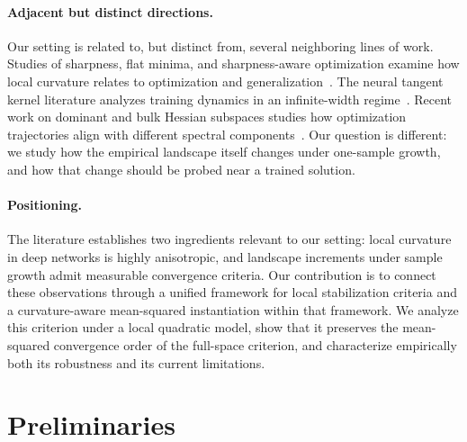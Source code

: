 \documentclass[10pt]{article}
\theoremstyle{plain}
\theoremstyle{remark}
\begin{document}
\paragraph{Adjacent but distinct directions.}
Our setting is related to, but distinct from, several neighboring lines of work.
Studies of sharpness, flat minima, and sharpness-aware optimization examine how local curvature relates to optimization and generalization~\citep{keskar2017largebatch,dinh2017sharp,foret2021sam,dauphin2024neglected,luo2024eigensam}.
The neural tangent kernel literature analyzes training dynamics in an infinite-width regime~\citep{jacot2018ntk}.
Recent work on dominant and bulk Hessian subspaces studies how optimization trajectories align with different spectral components~\citep{song2025tiny,zhou2025bsfa}.
Our question is different: we study how the empirical landscape itself changes under one-sample growth, and how that change should be probed near a trained solution.

\paragraph{Positioning.}
The literature establishes two ingredients relevant to our setting: local curvature in deep networks is highly anisotropic, and landscape increments under sample growth admit measurable convergence criteria.
Our contribution is to connect these observations through a unified framework for local stabilization criteria and a curvature-aware mean-squared instantiation within that framework.
We analyze this criterion under a local quadratic model, show that it preserves the mean-squared convergence order of the full-space criterion, and characterize empirically both its robustness and its current limitations.

\section{Preliminaries}
\label{sec:prelim}
\end{document}
